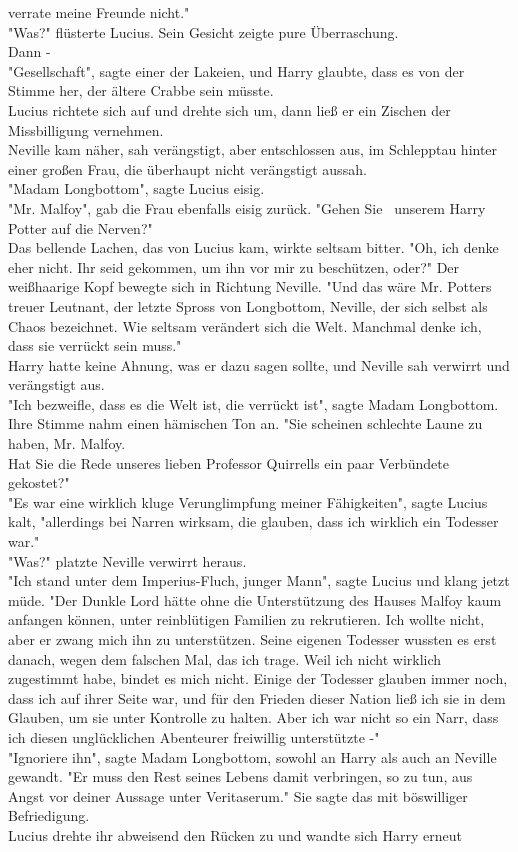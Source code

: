{verrate meine Freunde nicht."\\ "Was?" flüsterte Lucius. Sein Gesicht zeigte pure Überraschung.\\ Dann -\\ "Gesellschaft", sagte einer der Lakeien, und Harry glaubte, dass es von der Stimme her, der ältere Crabbe sein müsste.\\ Lucius richtete sich auf und drehte sich um, dann ließ er ein Zischen der Missbilligung vernehmen.\\ Neville kam näher, sah verängstigt, aber entschlossen aus, im Schlepptau hinter einer großen Frau, die überhaupt nicht verängstigt aussah.\\ "Madam Longbottom", sagte Lucius eisig.\\ "Mr. Malfoy", gab die Frau ebenfalls eisig zurück. "Gehen Sie ~unserem Harry Potter auf die Nerven?"\\ Das bellende Lachen, das von Lucius kam, wirkte seltsam bitter. "Oh, ich denke eher nicht. Ihr seid gekommen, um ihn vor mir zu beschützen, oder?" Der weißhaarige Kopf bewegte sich in Richtung Neville. "Und das wäre Mr. Potters treuer Leutnant, der letzte Spross von Longbottom, Neville, der sich selbst als Chaos bezeichnet. Wie seltsam verändert sich die Welt. Manchmal denke ich, dass sie verrückt sein muss."\\ Harry hatte keine Ahnung, was er dazu sagen sollte, und Neville sah verwirrt und verängstigt aus.\\ "Ich bezweifle, dass es die Welt ist, die verrückt ist", sagte Madam Longbottom. Ihre Stimme nahm einen hämischen Ton an. "Sie scheinen schlechte Laune zu haben, Mr. Malfoy.\\ Hat Sie die Rede unseres lieben Professor Quirrells ein paar Verbündete gekostet?"\\ "Es war eine wirklich kluge Verunglimpfung meiner Fähigkeiten", sagte Lucius kalt, "allerdings bei Narren wirksam, die glauben, dass ich wirklich ein Todesser war."\\ "Was?" platzte Neville verwirrt heraus.\\ "Ich stand unter dem Imperius-Fluch, junger Mann", sagte Lucius und klang jetzt müde. "Der Dunkle Lord hätte ohne die Unterstützung des Hauses Malfoy kaum anfangen können, unter reinblütigen Familien zu rekrutieren. Ich wollte nicht, aber er zwang mich ihn zu unterstützen. Seine eigenen Todesser wussten es erst danach, wegen dem falschen Mal, das ich trage. Weil ich nicht wirklich zugestimmt habe, bindet es mich nicht. Einige der Todesser glauben immer noch, dass ich auf ihrer Seite war, und für den Frieden dieser Nation ließ ich sie in dem Glauben, um sie unter Kontrolle zu halten. Aber ich war nicht so ein Narr, dass ich diesen unglücklichen Abenteurer freiwillig unterstützte -"\\ "Ignoriere ihn", sagte Madam Longbottom, sowohl an Harry als auch an Neville gewandt. "Er muss den Rest seines Lebens damit verbringen, so zu tun, aus Angst vor deiner Aussage unter Veritaserum." Sie sagte das mit böswilliger Befriedigung.\\ Lucius drehte ihr abweisend den Rücken zu und wandte sich Harry erneut }
